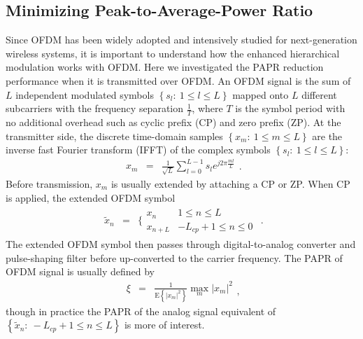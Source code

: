 \documentclass[conference]{IEEEtran}
\begin{document}
\subsection{Minimizing Peak-to-Average-Power Ratio}
Since OFDM has been widely adopted and intensively studied for
next-generation wireless systems, it is important to understand
how the enhanced hierarchical modulation works with OFDM. Here we
investigated the PAPR reduction performance when it is transmitted
over OFDM. An OFDM signal is the sum of $L$ independent modulated
symbols $\left\{s_{l}:\ 1\leq l\leq L\right\}$ mapped onto $L$
different subcarriers with the frequency separation $\frac{1}{T}$,
where $T$ is the symbol period with no additional overhead such as
cyclic prefix (CP) and zero prefix (ZP). At the transmitter side,
the discrete time-domain samples $\left\{x_{m}:\ 1\leq m\leq
L\right\}$ are the inverse fast Fourier transform (IFFT) of the
complex symbols $\left\{s_{l}:\ 1\leq l\leq L\right\}$:
\begin{equation}
\begin{array}{lcl}
x_{m}&=&\frac{1}{\sqrt{L}}\sum\limits_{l=0}^{L-1}s_{l}e^{j2\pi\frac{ml}{L}}
\end{array}.\label{OFDM}
\end{equation}
\noindent Before transmission, $x_{m}$ is usually extended by
attaching a CP or ZP. When CP is applied, the extended OFDM symbol
\begin{equation}
\begin{array}{rcl}
\tilde{x}_{n}&=&\Bigg\{ \begin{array}{ll}x_{n}&1\leq n\leq L\\
x_{n+L}&-L_{cp}+1\leq n\leq 0 \end{array}
\end{array}.
\end{equation}
\noindent The extended OFDM symbol then passes through
digital-to-analog converter and pulse-shaping filter before
up-converted to the carrier frequency. The PAPR of OFDM signal is
usually defined by
\begin{equation}
\begin{array}{rcl}
\xi&=&\frac{1 }{\mbox{E}\left\{\left|x_{m}\right|^2\right\}
}\max\limits_{m} \left|x_{m}\right|^{2}
\end{array},
\end{equation}
\noindent though in practice the PAPR of the analog signal
equivalent of $\left\{\tilde{x}_{n}:\ -L_{cp}+1\leq n\leq
L\right\}$ is more of interest.
\end{document}
